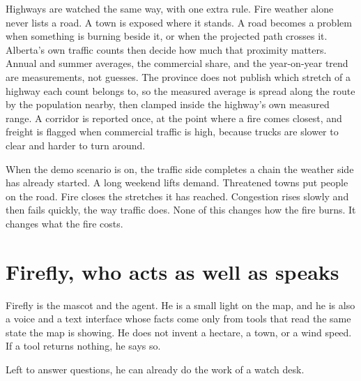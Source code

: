 \documentclass[11pt,a4paper]{article}
\begin{document}
Highways are watched the same way, with one extra rule. Fire weather alone never lists a road. A town is exposed where it stands. A road becomes a problem when something is burning beside it, or when the projected path crosses it. Alberta's own traffic counts then decide how much that proximity matters. Annual and summer averages, the commercial share, and the year-on-year trend are measurements, not guesses. The province does not publish which stretch of a highway each count belongs to, so the measured average is spread along the route by the population nearby, then clamped inside the highway's own measured range. A corridor is reported once, at the point where a fire comes closest, and freight is flagged when commercial traffic is high, because trucks are slower to clear and harder to turn around.

When the demo scenario is on, the traffic side completes a chain the weather side has already started. A long weekend lifts demand. Threatened towns put people on the road. Fire closes the stretches it has reached. Congestion rises slowly and then fails quickly, the way traffic does. None of this changes how the fire burns. It changes what the fire costs.

\section{Firefly, who acts as well as speaks}

Firefly is the mascot and the agent. He is a small light on the map, and he is also a voice and a text interface whose facts come only from tools that read the same state the map is showing. He does not invent a hectare, a town, or a wind speed. If a tool returns nothing, he says so.

Left to answer questions, he can already do the work of a watch desk.
\end{document}
